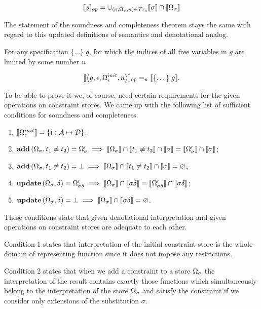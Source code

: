  \[
\llbracket{s}\rrbracket_{op} = \cup_{(\sigma, \Omega_\sigma, n) \in \mathcal{T}r_{s}} \llbracket{\sigma}\rrbracket \cap \llbracket{\Omega_\sigma}\rrbracket
\]

The statement of the soundness and completeness theorem stays the same with regard to this updated definitions of semantics and denotational analog.

\begin{theorem}
For any specification $\{\dots\}\; g$, for which the indices of all free variables in $g$ are limited by some number $n$

\[
\llbracket{\left<{g, \epsilon, \Omega_\epsilon^{init}, n}\right>}\rrbracket_{op} =_n \llbracket{\{\dots\}\; g}\rrbracket.
\]
\end{theorem}

To be able to prove it we, of course, need certain requirements for the given operations on constraint stores. We came up with the following list of sufficient
conditions for soundness and completeness.

\begin{enumerate}
\item $\llbracket{\Omega_\epsilon^{init}}\rrbracket = \{\mathfrak{f}:\mathcal{A}\mapsto\mathcal{D}\}$;
\item $\mathbf{add}\,(\Omega_\sigma, t_1 \not\equiv t_2) = \Omega^\prime_\sigma \implies \llbracket{\Omega_\sigma}\rrbracket \cap \llbracket{t_1 \not\equiv t_2}\rrbracket \cap \llbracket{\sigma}\rrbracket = \llbracket{\Omega^\prime_\sigma}\rrbracket \cap \llbracket{\sigma}\rrbracket$;
\item $\mathbf{add}\,(\Omega_\sigma, t_1 \not\equiv t_2) = \bot \implies \llbracket{\Omega_\sigma}\rrbracket \cap \llbracket{t_1 \not\equiv t_2}\rrbracket \cap \llbracket{\sigma}\rrbracket = \varnothing$;
\item $\mathbf{update}\,(\Omega_\sigma, \delta) = \Omega^\prime_{\sigma \delta} \implies \llbracket{\Omega_\sigma}\rrbracket \cap \llbracket{\sigma \delta}\rrbracket = \llbracket{\Omega^\prime_{\sigma \delta}}\rrbracket \cap \llbracket{\sigma \delta}\rrbracket$;
\item $\mathbf{update}\,(\Omega_\sigma, \delta) = \bot \implies \llbracket{\Omega_\sigma}\rrbracket \cap \llbracket{\sigma \delta}\rrbracket = \varnothing$.
\end{enumerate}

These conditions state that given denotational interpretation and given operations on constraint stores are adequate to each other.

Condition 1 states that interpretation of the initial constraint store is the whole domain of representing function since it does not impose any restrictions.

Condition 2 states that when we add a constraint to a store $\Omega_\sigma$ the interpretation of the result contains exactly those functions which simultaneously belong to
the interpretation of the store $\Omega_\sigma$ and satisfy the constraint if we consider only extensions of the substitution $\sigma$.

